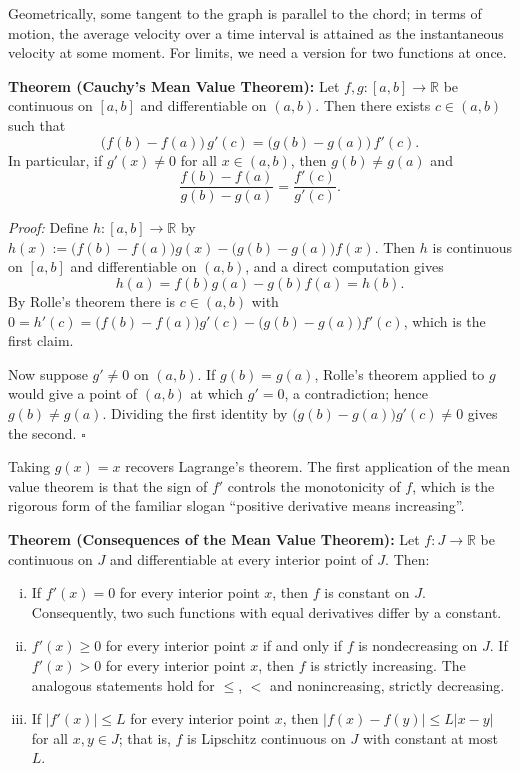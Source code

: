 \documentclass[a4paper,11pt,abstracton]{scrartcl}
\newcommand{\RR}{\mathbb{R}}
\theoremstyle{dotlessP}
\theoremstyle{dotlessS}
\theoremstyle{remark}
\theoremstyle{definition}
\begin{document}
Geometrically, some tangent to the graph is parallel to the chord; in terms of motion, the average velocity over a time interval is attained as the instantaneous velocity at some moment. For limits, we need a version for two functions at once.

\begin{problem_box}
\textbf{Theorem (Cauchy's Mean Value Theorem):}
Let $f,g:[a,b]\to\RR$ be continuous on $[a,b]$ and differentiable on $(a,b)$. Then there exists $c\in(a,b)$ such that
\[
    \bigl(f(b)-f(a)\bigr)\,g'(c)=\bigl(g(b)-g(a)\bigr)\,f'(c).
\]
In particular, if $g'(x)\ne0$ for all $x\in(a,b)$, then $g(b)\ne g(a)$ and
\[
    \frac{f(b)-f(a)}{g(b)-g(a)}=\frac{f'(c)}{g'(c)}.
\]
\end{problem_box}

\begin{claim_box}
\textit{Proof:}
Define $h:[a,b]\to\RR$ by $h(x):=\bigl(f(b)-f(a)\bigr)g(x)-\bigl(g(b)-g(a)\bigr)f(x)$. Then $h$ is continuous on $[a,b]$ and differentiable on $(a,b)$, and a direct computation gives
\[
    h(a)=f(b)g(a)-g(b)f(a)=h(b).
\]
By Rolle's theorem there is $c\in(a,b)$ with $0=h'(c)=\bigl(f(b)-f(a)\bigr)g'(c)-\bigl(g(b)-g(a)\bigr)f'(c)$, which is the first claim.

Now suppose $g'\ne0$ on $(a,b)$. If $g(b)=g(a)$, Rolle's theorem applied to $g$ would give a point of $(a,b)$ at which $g'=0$, a contradiction; hence $g(b)\ne g(a)$. Dividing the first identity by $\bigl(g(b)-g(a)\bigr)g'(c)\ne0$ gives the second.
\hfill$\square$
\end{claim_box}

Taking $g(x)=x$ recovers Lagrange's theorem. The first application of the mean value theorem is that the sign of $f'$ controls the monotonicity of $f$, which is the rigorous form of the familiar slogan ``positive derivative means increasing''.

\begin{problem_box}
\textbf{Theorem (Consequences of the Mean Value Theorem):}
Let $f:J\to\RR$ be continuous on $J$ and differentiable at every interior point of $J$. Then:
\begin{enumerate}[(i)]
    \item If $f'(x)=0$ for every interior point $x$, then $f$ is constant on $J$. Consequently, two such functions with equal derivatives differ by a constant.
    \item $f'(x)\ge0$ for every interior point $x$ if and only if $f$ is nondecreasing on $J$. If $f'(x)>0$ for every interior point $x$, then $f$ is strictly increasing. The analogous statements hold for $\le$, $<$ and nonincreasing, strictly decreasing.
    \item If $|f'(x)|\le L$ for every interior point $x$, then $|f(x)-f(y)|\le L|x-y|$ for all $x,y\in J$; that is, $f$ is Lipschitz continuous on $J$ with constant at most $L$.
\end{enumerate}
\end{problem_box}
\end{document}
